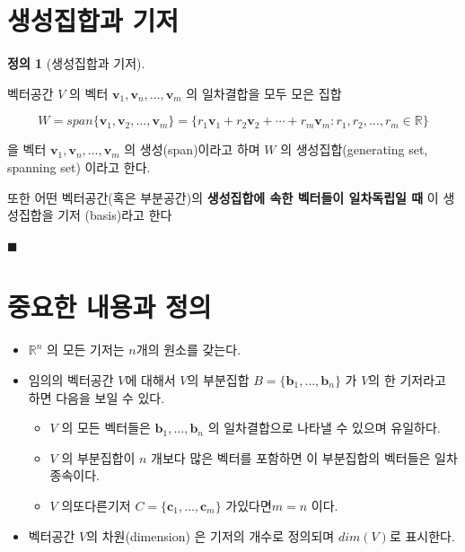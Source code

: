 \documentclass[
  11pt,
  a4paper,
  oneside]{scrbook}
\providecommand{\tightlist}{%
  \setlength{\itemsep}{0pt}\setlength{\parskip}{0pt}}\usepackage{longtable,booktabs,array}
\newcommand{\RR}{\mathbb{R}}
\theoremstyle{definition}
\newtheorem{definition}{정의}[chapter]
\theoremstyle{definition}
\theoremstyle{plain}
\theoremstyle{remark}
\begin{document}
\section{생성집합과
기저}\label{uxc0dduxc131uxc9d1uxd569uxacfc-uxae30uxc800}

\begin{definition}[생성집합과
기저]\protect\hypertarget{def-generating-set}{}\label{def-generating-set}

벡터공간 \(V\) 의 벡터 \(\pmb v_1,\pmb v_n, \dots, \pmb v_m\) 의
일차결합을 모두 모은 집합

\[ W = span\{\pmb v_1,\pmb v_2, \dots, \pmb v_m \} = \{r_1\pmb v_1 + r_2 \pmb v_2 + \cdots+ r_m \pmb v_m:
r_1,r_2,\dots,r_m \in \RR \}\]

을 벡터 \(\pmb v_1,\pmb v_n, \dots, \pmb v_m\) 의 생성(span)이라고 하며
\(W\) 의 생성집합(generating set, spanning set) 이라고 한다.

또한 어떤 벡터공간(혹은 부분공간)의 \textbf{생성집합에 속한 벡터들이
일차독립일 때} 이 생성집합을 기저 (basis)라고 한다

\(\blacksquare\)

\end{definition}

\section{중요한 내용과
정의}\label{uxc911uxc694uxd55c-uxb0b4uxc6a9uxacfc-uxc815uxc758-5}

\begin{itemize}
\tightlist
\item
  \(\RR^n\) 의 모든 기저는 \(n\)개의 원소를 갖는다.
\item
  임의의 벡터공간 \(V\)에 대해서 \(V\)의 부분집합
  \(B = \{\pmb b_1,\dots,\pmb b_n\}\) 가 \(V\)의 한 기저라고 하면 다음을
  보일 수 있다.

  \begin{itemize}
  \tightlist
  \item
    \(V\) 의 모든 벡터들은 \(\pmb b_1,\dots,\pmb b_n\) 의 일차결합으로
    나타낼 수 있으며 유일하다.
  \item
    \(V\) 의 부분집합이 \(n\) 개보다 많은 벡터를 포함하면 이 부분집합의
    벡터들은 일차종속이다.
  \item
    \(V\) 의또다른기저 \(C=\{\pmb c_1,\dots,\pmb c_m \}\)
    가있다면\(m=n\) 이다.
  \end{itemize}
\item
  벡터공간 \(V\)의 차원(dimension) 은 기저의 개수로 정의되며
  \(dim(V)\)로 표시한다.
\end{itemize}
\end{document}
